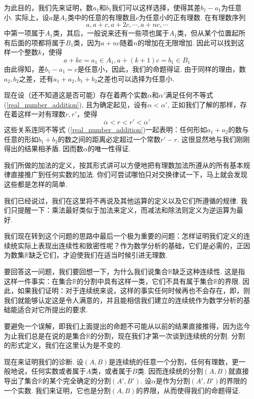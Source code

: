 \documentclass[color=cyan,mathpazo,titlestyle=hang]{elegantbook_mac}
\begin{document}
为此目的，我们先来证明，数$a_1$和$b_1$我们可以这样选择，使得其差$b_1-a_1$为任意小. 实际上，设$a$是$A_1$类中的任意的有理数且$c$为任意小的正有理数. 在有理数序列
$$a, a+c, a+2c, \cdots, a+nc, \cdots$$
中第一项属于$A_1$类，其后，一般说来还有一些项也属于$A_1$类，但从某个位置起所有后面的项都将属于$B_1$类，因为$a+nc$随着$n$的增加在无限增加. 因此可以找到这样一个整数$k$，使得
$$a+kc=a_1\in A_1, a+(k+1)c=b_1\in B_1$$
由此得知，差$b_1-a_1=c$是任意小，因此，我们的命题得证. 由于同样的理由，数$a_2, b_2$之差，还有$a_1+a_2, b_1+b_2$之差也可以选择为任意小. 

现在设（还不知道这是否可能）存在着两个实数$\alpha$和$\alpha'$满足任何不等式 (\ref{real_number_addition}), 且为确定起见，设有$\alpha<\alpha'$, 正如我们了解的那样，存在着这样一对有理数$r, r'$，使得
$$\alpha<r<r'<\alpha'$$
这些关系连同不等式 (\ref{real_number_addition})一起表明：任何形如$a_1+a_2$的数与任意的形如$b_1+b_2$的数之间的距离必定超过一个常数$r'-r$. 这很显然地与我们刚刚得出的结果相矛盾. 因而数$\alpha$的唯一性得证. 

我们所做的加法的定义，按其形式讲可以方便地把有理数加法所遵从的所有基本规律直接推广到任何实数的加法. 你们可尝试哪怕只对交换律试一下，马上就会发现这些都是怎样的简单. 

我们已经说过，我们在这里将不再说及其他运算的定义以及它们所遵循的规律. 我们只提醒一下：乘法最好类似于加法来定义，而减法和除法则定义为逆运算为最好. 

我们现在转到这个问题的思路中最后一个极为重要的问题：怎样证明我们定义的连续统实际上表现出连续性和致密性呢？作为数学分析的基础，它们是必需的，正因为数集$\mathbb{R}$缺乏它们，才迫使我们在适当时候引进无理数. 

要回答这一问题，我们要回想一下，为什么我们说集合$\mathbb{R}$缺乏这种连续性. 这是指这样一件事实：在集合$\mathbb{R}$的分割中具有这样一类，它们不具有属于集合$\mathbb{R}$的界限. 因此，如果我们证明：对于连续统来说，这样的事实任何时候再也不会存在，即，则我们就能够认定这是令人满意的，并且能相信我们建立的连续统作为数学分析的基础能适合对它所提出的要求. 

要避免一个误解，即我们上面提出的命题不可能从以前的结果直接推得，因为迄今为止我们总是在说的是集合$\mathbb{R}$的分割，现在我们才第一次谈到连续统的分割. 分割的形式定义，我们在这里认为是不变的. 

现在来证明我们的诊断. 设$(A,B)$是连续统的任意一个分割，任何有理数，更一般地说，任何实数或者属于$A$类，或者属于$B$类. 因而连续统的分割$(A,B)$就直接导出了集合$\mathbb{R}$的某个完全确定的分割$(A',B')$. 设$\alpha$是作为分割$(A',B')$的界限的一个实数. 我们来证明，它也是分割$(A,B)$的界限，从而使得我们的命题得证. 
\end{document}
